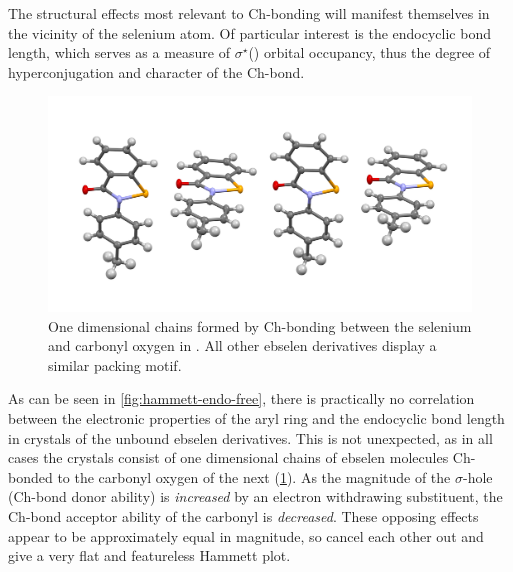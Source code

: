 \begin{refsection}
The structural effects most relevant to Ch-bonding will manifest themselves in the vicinity of the selenium atom.
Of particular interest is the endocyclic  bond length, which serves as a measure of $\sigma^\star$() orbital occupancy, thus the degree of hyperconjugation and character of the Ch-bond.

\begin{figure}
  \centering
  \includegraphics[width=0.6\linewidth]{Figures/ebs.me-packing.pdf}
  \caption[One dimensional chains formed by Ch-bonding between the selenium and carbonyl oxygen in .]{One dimensional chains formed by Ch-bonding between the selenium and carbonyl oxygen in . All other ebselen derivatives display a similar packing motif.}\label{fig:ebs-me-packing}
\end{figure}

As can be seen in \cref{fig:hammett-endo-free}, there is practically no correlation between the electronic properties of the aryl ring and the endocyclic  bond length in crystals of the unbound ebselen derivatives.
This is not unexpected, as in all cases the crystals consist of one dimensional chains of ebselen molecules Ch-bonded to the carbonyl oxygen of the next (\cref{fig:ebs-me-packing}).
As the magnitude of the $ \sigma $-hole (Ch-bond donor ability) is \emph{increased} by an electron withdrawing substituent, the Ch-bond acceptor ability of the carbonyl is \emph{decreased}.
These opposing effects appear to be approximately equal in magnitude, so cancel each other out and give a very flat and featureless Hammett plot.



\end{refsection}
